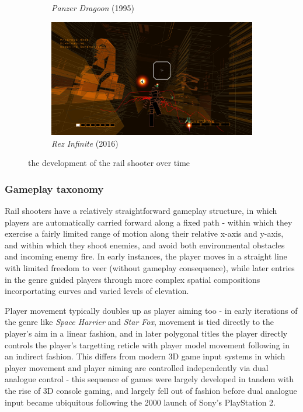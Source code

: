 \documentclass{article}
\begin{document}
\begin{figure}[h]
\begin{subfigure}{.5\textwidth}
  \caption{\textit{Panzer Dragoon} (1995)}
  \label{fig:sfig3}
\end{subfigure}
\begin{subfigure}{.5\textwidth}
  \centering
  \includegraphics[width=.8\linewidth]{rez}
  \caption{\textit{Rez Infinite} (2016)}
  \label{fig:sfig4}
\end{subfigure}
\caption{the development of the rail shooter over time}
\label{fig:history}
\end{figure}

\subsubsection*{Gameplay taxonomy}

Rail shooters have a relatively straightforward gameplay structure, in which players are
automatically carried forward along a fixed path - within which they exercise a fairly
limited range of motion along their relative x-axis and y-axis, and within which they
shoot enemies, and avoid both environmental obstacles and incoming enemy fire. In early instances,
the player moves in a straight line with limited freedom to veer (without gameplay consequence),
while later entries in the genre guided players through more complex spatial compositions incorportating
curves and varied levels of elevation.

Player movement typically doubles up as player aiming too - in early iterations of the genre like
\textit{Space Harrier} and \textit{Star Fox}, movement is tied directly to the player's aim in a
linear fashion, and in later polygonal titles the player directly controls the player's targetting
reticle with player model movement following in an indirect fashion. This differs from modern 3D
game input systems in which player movement and player aiming are controlled independently via dual 
analogue control - this sequence of games were largely developed in tandem with the rise of 3D console
gaming, and largely fell out of fashion before dual analogue input became ubiquitous following the
2000 launch of Sony's PlayStation 2.
\end{document}
